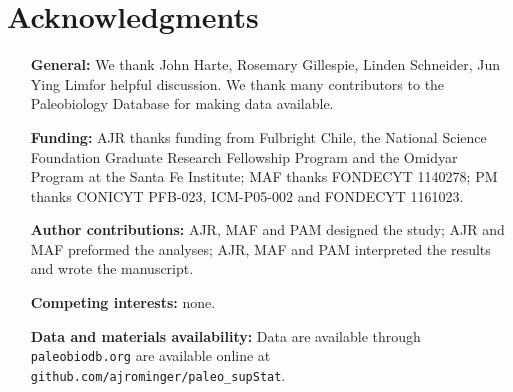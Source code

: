 \documentclass[12pt]{article}
\providecommand{\DIFadd}[1]{{\color{blue}{#1}}} %
\providecommand{\DIFdel}[1]{{\protect\color{red}\sout{}}}                      %
\providecommand{\DIFaddbegin}{} %
\providecommand{\DIFaddend}{} %
\providecommand{\DIFdelbegin}{} %
\providecommand{\DIFdelend}{} %
\newcommand{\DIFscaledelfig}{0.5}
\newlength{\DIFdelgraphicswidth} %
\newlength{\DIFdelgraphicsheight} %
\newcommand{\DIFaddincludegraphics}[2][]{{\color{blue}\fbox{\DIFOincludegraphics[#1]{#2}}}} %
\newcommand{\DIFdelincludegraphics}[2][]{%
\sbox{\DIFdelgraphicsbox}{\DIFOincludegraphics[#1]{#2}}%
\settoboxwidth{\DIFdelgraphicswidth}{\DIFdelgraphicsbox} %
\settoboxtotalheight{\DIFdelgraphicsheight}{\DIFdelgraphicsbox} %
\scalebox{\DIFscaledelfig}{%
\parbox[b]{\DIFdelgraphicswidth}{\usebox{\DIFdelgraphicsbox}\\[-\baselineskip] \rule{\DIFdelgraphicswidth}{0em}}\llap{\resizebox{\DIFdelgraphicswidth}{\DIFdelgraphicsheight}{%
\setlength{\unitlength}{\DIFdelgraphicswidth}%
\begin{picture}(1,1)%
\thicklines\linethickness{2pt} %
{\color[rgb]{1,0,0}\put(0,0){\framebox(1,1){}}}%
{\color[rgb]{1,0,0}\put(0,0){\line( 1,1){1}}}%
{\color[rgb]{1,0,0}\put(0,1){\line(1,-1){1}}}%
\end{picture}%
}\hspace*{3pt}}} %
} %
\DeclareRobustCommand{\DIFaddbegin}{\DIFOaddbegin \let\includegraphics\DIFaddincludegraphics} %
\DeclareRobustCommand{\DIFaddend}{\DIFOaddend \let\includegraphics\DIFOincludegraphics} %
\DeclareRobustCommand{\DIFdelbegin}{\DIFOdelbegin \let\includegraphics\DIFdelincludegraphics} %
\DeclareRobustCommand{\DIFdelend}{\DIFOaddend \let\includegraphics\DIFOincludegraphics} %
\begin{document}
\section*{Acknowledgments}
\begin{itemize}
\item[{\bf General:}] We thank John Harte, Rosemary Gillespie, Linden
  Schneider, \DIFdelbegin \DIFdel{and }\DIFdelend Jun Ying Lim\DIFaddbegin \DIFadd{, and David Jablonski }\DIFaddend for helpful
  discussion. We thank \DIFdelbegin \DIFdel{the
  }\DIFdelend \DIFaddbegin \DIFadd{Aaron Clauset and four anonymous reviewers for
  greatly improving the quality of this manuscript. We thank the }\DIFaddend many
  contributors to the Paleobiology Database for making data available\DIFdelbegin \DIFdel{, and Michael Foote for providing a digitized copy of
  Sepkoski's compendium}\DIFdelend .
\item[{\bf Funding:}] AJR thanks funding from Fulbright Chile, the
  National Science Foundation Graduate Research Fellowship Program and
  the Omidyar Program at the Santa Fe Institute; MAF thanks FONDECYT
  1140278; PM thanks CONICYT PFB-023, ICM-P05-002 and FONDECYT
  1161023.
\item[{\bf Author contributions:}] AJR, MAF and PAM designed the
  study; AJR and MAF preformed the analyses; AJR, MAF and PAM
  interpreted the results and wrote the manuscript.
\item[{\bf Competing interests:}] none.
\item[{\bf Data and materials availability:}] Data are available
  through \DIFaddbegin \DIFadd{the Paleobiology Database (}\DIFaddend
  {\tt paleobiodb.org}\DIFdelbegin \DIFdel{, analysis scripts
  }\DIFdelend \DIFaddbegin \DIFadd{) and all code needed to interface
    with the }{\tt \DIFadd{paleobiodb.org}} \DIFadd{API, process,
    clean, and ultimately analyze the data }\DIFaddend are available
  online at \\
  {\tt github.com/ajrominger/paleo\_supStat}. \DIFaddbegin
  \DIFadd{This github repository also hosts the exact download from
  }{\tt \DIFadd{paleobiodb.org}} \DIFadd{used in this analysis. All
    required scripts are also available and explained in supplemental
    Appendix A.  }\DIFaddend \end{itemize}


\clearpage
\setcounter{page}{1}
\nolinenumbers

\newcommand{\beginsupplement}{%
  \setcounter{table}{0}
  \renewcommand{\thetable}{S\arabic{table}}%
  \setcounter{figure}{0}
  \renewcommand{\thefigure}{S\arabic{figure}}%
  \setcounter{section}{0}
  \renewcommand{\thesection}{S\arabic{section}}%
}
\end{document}
